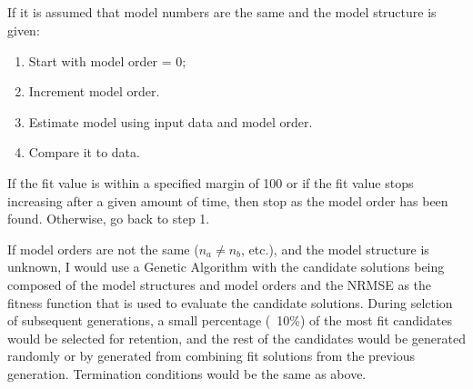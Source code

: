\documentclass[times,12pt,reqno]{amsart}
\begin{document}
\subsection{}
If it is assumed that model numbers are the same and the model structure is
given:
\begin{enumerate}
    \item Start with model order = 0;
    \item Increment model order.
    \item Estimate model using input data and model order.
    \item Compare it to data.
\end{enumerate}
If the fit value is within a specified margin of 100 or
if the fit value stops increasing after a given amount of time, then stop as
the model order has been found. Otherwise, go back to step 1.

If model orders are not the same ($ n_a \neq n_b $, etc.), and the model
structure is unknown, I would use a Genetic Algorithm with the candidate
solutions being composed of the model structures and model orders and the NRMSE
as the fitness function that is used to evaluate the candidate solutions.
During selction of subsequent generations, a small percentage (~10\%) of the
most fit candidates would be selected for retention, and the rest of the
candidates would be generated randomly or by generated from combining fit
solutions from the previous generation. Termination conditions would be the
same as above.
\end{document}
